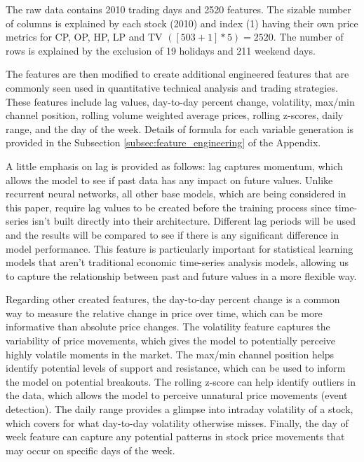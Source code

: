 \documentclass[11pt]{article}
\begin{document}
The raw data contains 2010 trading days and 2520 features. The sizable number of columns is explained by each stock (2010) and index (1) having their own price metrics for CP, OP, HP, LP and TV $([503+1] * 5)=2520$. The number of rows is explained by the exclusion of 19 holidays and 211 weekend days.

The features are then modified to create additional engineered features that are commonly seen used in quantitative technical analysis and trading strategies. These features include lag values, day-to-day percent change, volatility, max/min channel position, rolling volume weighted average prices, rolling z-scores, daily range, and the day of the week. Details of formula for each variable generation is provided in the Subsection \ref{subsec:feature_engineering} of the Appendix.


A little emphasis on lag is provided as follows: lag captures momentum, which allows the model to see if past data has any impact on future values. Unlike recurrent neural networks, all other base models, which are being considered in this paper, require lag values to be created before the training process since time-series isn't built directly into their architecture. Different lag periods will be used and the results will be compared to see if there is any significant difference in model performance. This feature is particularly important for statistical learning models that aren't traditional economic time-series analysis models, allowing us to capture the relationship between past and future values in a more flexible way.%

Regarding other created features, the day-to-day percent change is a common way to measure the relative change in price over time, which can be more informative than absolute price changes. The volatility feature captures the variability of price movements, which gives the model to potentially perceive highly volatile moments in the market. The max/min channel position helps identify potential levels of support and resistance, which can be used to inform the model on potential breakouts. The rolling z-score can help identify outliers in the data, which allows the model to perceive unnatural price movements (event detection). The daily range provides a glimpse into intraday volatility of a stock, which covers for what day-to-day volatility otherwise misses. Finally, the day of week feature can capture any potential patterns in stock price movements that may occur on specific days of the week. %
\end{document}

